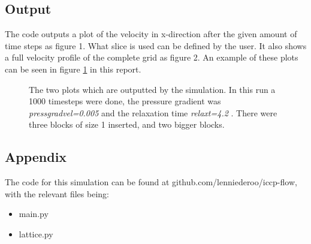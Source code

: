 \documentclass[a4paper]{article}
\begin{document}
\begin{multicols*}{2}
\subsection*{Output}
The code outputs a plot of the velocity in x-direction after the given amount of time steps as figure 1. What slice is used can be defined by the user. It also shows a full velocity profile of the complete grid as figure 2. An example of these plots can be seen in figure \ref{fig:plots} in this report. 
 \begin{figure}
\centering
{}
\caption{The two plots which are outputted by the simulation. In this run a 1000 timesteps were done, the pressure gradient was \emph{pressgradvel=0.005} and the relaxation time \emph{relaxt=4.2 }. There were three blocks of size 1 inserted, and two bigger blocks.}
 \label{fig:plots}
\end{figure} 
\subsection*{Appendix}
The code for this simulation can be found at github.com/lenniederoo/iccp-flow, with the relevant files being:
\begin{itemize}
\item main.py
\item lattice.py
\end{itemize}
\end{multicols*}
\end{document}
